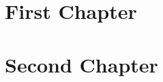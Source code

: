 \documentclass[12pt]{UWMadThesis}
\begin{document}
\MakeTitlePage{}

\begin{LicensePage}
    \CreativeCommons
    \Attribution
    \NonCommercial
    \ShareAlike
\end{LicensePage}

\TableOfContents

\acknowledgments{}
\lipsum[1]

\abstract
\lipsum[2-3]


\begin{Nomenclature}
\end{Nomenclature}


\chapter{First Chapter}
\lipsum[2-3]


\chapter{Second Chapter}
\lipsum[4-6]


\lipsum[7-9]


\lipsum[10-15]

\show\doublespacing
\end{document}
